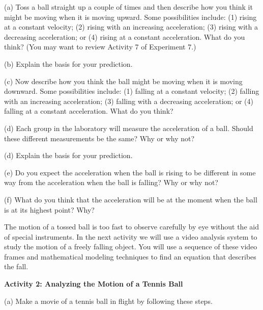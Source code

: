 (a) Toss a ball straight up a couple of times and then describe how you think
it might be moving when it is moving upward. Some possibilities include: (1)
rising at a constant velocity; (2) rising with an increasing acceleration; (3)
rising with a decreasing acceleration; or (4) rising at a constant acceleration. What do you think? (You may want to review Activity 7 of Experiment 7.)
\vspace{20mm}

(b) Explain the basis for your prediction.
\vspace{20mm}

(c) Now describe how you think the ball might be moving when it is moving downward. Some possibilities include: (1) falling at a constant velocity; (2) falling
with an increasing acceleration; (3) falling with a decreasing acceleration;
or (4) falling at a constant acceleration. What do you think?
\vspace{20mm}

(d) Each group in the laboratory will measure the acceleration of a ball. Should these different measurements be the same? Why or why not?
\vspace{20mm}

(d) Explain the basis for your prediction.
\vspace{20mm}

(e) Do you expect the acceleration when the ball is rising to be different in
some way from the acceleration when the ball is falling? Why or why not?
\vspace{20mm}

(f) What do you think that the acceleration will be at the moment when the ball
is at its highest point? Why?
\vspace{20mm}

The motion of a tossed ball is too fast to observe carefully by eye without
the aid of special instruments. In the next activity we will use a video analysis system to study the motion of a freely falling object. You will use a sequence of these video frames and mathematical modeling techniques to find an equation that describes the fall. 

\textbf{Activity 2: Analyzing the Motion of a Tennis Ball} 

(a) Make a movie of a tennis ball in flight by following these steps.

